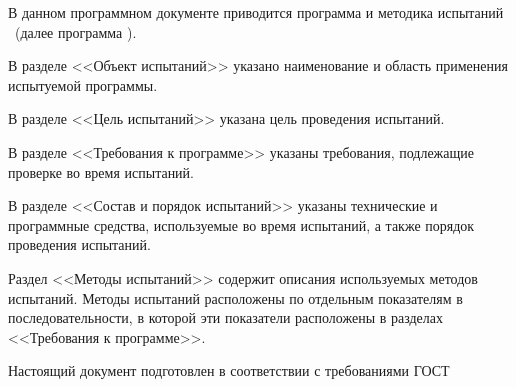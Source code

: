\newpage\annotation

В данном программном документе приводится программа и методика испытаний \programname\ (далее программа \productnamesecond).

В разделе <<Объект испытаний>> указано наименование и область применения испытуемой программы.

В разделе <<Цель испытаний>> указана цель проведения испытаний.

В разделе <<Требования к программе>> указаны требования, подлежащие проверке во время испытаний.

В разделе <<Состав и порядок испытаний>> указаны технические и программные средства, используемые во время испытаний, а также порядок проведения испытаний.

Раздел <<Методы испытаний>> содержит описания используемых методов испытаний. Методы испытаний расположены по отдельным показателям в последовательности, в которой эти показатели расположены в разделах <<Требования к программе>>.

Настоящий документ подготовлен в соответствии с требованиями ГОСТ~\cite{gost19301}
